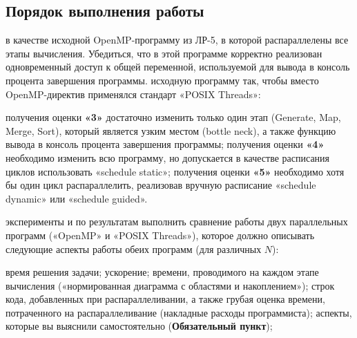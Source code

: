 { %
	\subsection{Порядок выполнения работы}
	\begin{enumerate}
		 в качестве исходной OpenMP-программу из ЛР-5, в которой распараллелены все этапы вычисления. Убедиться, что в этой программе корректно реализован одновременный доступ к общей переменной, используемой для вывода в консоль процента завершения программы.
		 исходную программу так, чтобы вместо OpenMP-директив применялся стандарт «POSIX Threads»:
			\begin{itemize}
				 получения оценки \textbf{«3»} достаточно изменить только один этап (Generate, Map, Merge, Sort), который является узким местом (bottle neck), а также функцию вывода в консоль процента завершения программы;
				 получения оценки \textbf{«4»} необходимо изменить всю программу, но допускается в качестве расписания циклов использовать «schedule static»;
				 получения оценки \textbf{«5»} необходимо хотя бы один цикл распараллелить, реализовав вручную расписание «schedule dynamic» или «schedule guided».
			\end{itemize}
		 эксперименты и по результатам выполнить сравнение работы двух параллельных программ («OpenMP» и «POSIX Threads»), которое должно описывать следующие аспекты работы обеих программ (для различных $N$):
			\begin{itemize}
				 время решения задачи;
				\itemпараллельное ускорение;
				 времени, проводимого на каждом этапе вычисления («нормированная
диаграмма с областями и накоплением»);
				 строк кода, добавленных при распараллеливании, а также грубая оценка
времени, потраченного на распараллеливание (накладные расходы программиста);
				 аспекты, которые вы выяснили самостоятельно (\textbf{Обязательный пункт});
			\end{itemize}
	\end{enumerate}
}
